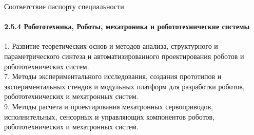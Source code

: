 \begin{frame}[t]{Соответствие паспорту специальности}
    \framesubtitle{2.5.4 Робототехника, Роботы, мехатроника и
    робототехнические системы}
    1. Развитие теоретических основ и методов анализа, структурного и параметрического синтеза и автоматизированного проектирования роботов и робототехнических систем. \\
    7. Методы экспериментального исследования, создания прототипов и
    экспериментальных стендов и модульных платформ для разработки роботов, робототехнических и мехатронных систем. \\
    9. Методы расчета и проектирования мехатронных сервоприводов,
    исполнительных, сенсорных и управляющих компонентов роботов,
    робототехнических и мехатронных систем.
\end{frame}


